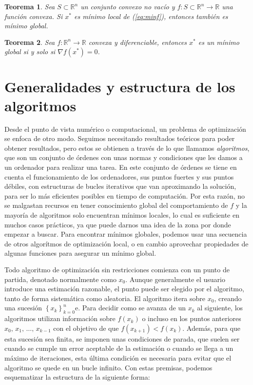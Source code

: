 \documentclass[11pt,a4paper]{book}
\newtheorem{theorem}{Teorema}[chapter]
\theoremstyle{definition}
\theoremstyle{remark}
\newcommand{\sucesionxk}{\left\{x_k\right\}}
\begin{document}
\begin{theorem}
	Sea $S \subset \mathbb{R}^n$ un conjunto convexo no vacío y
	$f:S \subset \mathbb{R}^n \rightarrow \mathbb{R}$ una función convexa. Si $x^*$ es mínimo
	local de (\ref{eq:minf}), entonces también es mínimo global.
\end{theorem}

\begin{theorem} \label{th:convx}
	Sea $f: \mathbb{R}^n \rightarrow \mathbb{R}$ convexa y diferenciable, entonces $x^*$ es un
	mínimo global si y solo si $\nabla f(x^*) = 0$.
\end{theorem}


\section{Generalidades y estructura de los algoritmos}

Desde el punto de vista numérico o computacional, un problema de optimización se enfoca de otro
modo. Seguimos necesitando resultados teóricos para poder obtener resultados, pero estos se obtienen
a través de lo que llamamos \textit{algoritmos}, que son un conjunto de órdenes con unas normas y
condiciones que les damos a un ordenador para realizar una tarea. En este conjunto de órdenes
se tiene en cuenta el funcionamiento de los ordenadores, sus puntos fuertes y sus puntos débiles, con
estructuras de bucles iterativos que van aproximando la solución, para ser lo más eficientes posibles en tiempo de computación. Por esta razón, no se malgastan recursos en tener conocimiento global del comportamiento de $f$ y la mayoría de algoritmos solo encuentran mínimos locales, lo cual es suficiente en muchos casos prácticos, ya que puede darnos una idea de la zona por donde empezar a buscar. Para encontrar mínimos globales, podemos usar una secuencia de otros algorítmos de optimización local, o en cambio aprovechar propiedades de algunas funciones para asegurar un mínimo global.

Todo algoritmo de optimización sin restricciones comienza con un punto de partida, denotado
normalmente como $x_{0}$. Aunque generalmente el usuario introduce una estimación razonable,
el punto puede ser elegido por el algoritmo, tanto de forma sistemática como aleatoria.
El algoritmo itera sobre $x_{0}$, creando una sucesión $\sucesionxk_{k=0}^n$e. Para decidir
como se avanza de un $x_k$ al siguiente, los algoritmos utilizan información sobre $f(x_k)$ o
incluso en los puntos anteriores $x_0,\, x_1,\, \ldots,\,x_{k-1}$ con el objetivo de que
$f(x_{k+1})<f(x_{k})$. Además, para que esta sucesión sea finita, se imponen unas condiciones
de parada, que suelen ser cuando se cumple un error aceptable de la estimación o cuando se
llega a un máximo de iteraciones, esta última condición es necesaria para evitar que el algoritmo se quede en un bucle infinito. Con estas premisas, podemos esquematizar la estructura de la siguiente forma:
\end{document}
